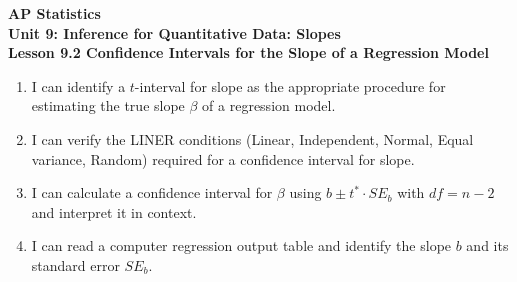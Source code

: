 \documentclass[10pt]{article}
\begin{document}
\vspace{-0.8in}

\begin{center}
  {\color{white}\textbf{\LARGE AP Statistics}}\\[4pt]
  {\color{skymid}\large\textbf{Unit 9: Inference for Quantitative Data: Slopes}}\\[6pt]
  {\color{white}\textbf{\large Lesson 9.2 \quad Confidence Intervals for the Slope of a Regression Model}}
\end{center}

\vspace{0.22in}
\namedateperiod
\vspace{0.18in}

\begin{learningtargetbox}
\small
\begin{enumerate}[leftmargin=1.5em, itemsep=5pt]
  \item I can identify a $t$-interval for slope as the appropriate procedure for
        estimating the true slope $\beta$ of a regression model.
  \item I can verify the LINER conditions (Linear, Independent, Normal, Equal variance,
        Random) required for a confidence interval for slope.
  \item I can calculate a confidence interval for $\beta$ using $b \pm t^* \cdot SE_b$
        with $df = n-2$ and interpret it in context.
  \item I can read a computer regression output table and identify the slope $b$ and
        its standard error $SE_b$.
\end{enumerate}
\end{learningtargetbox}

\vspace{0.14in}
\end{document}
